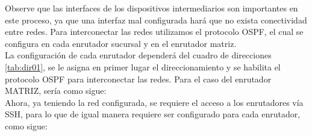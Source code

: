 \documentclass[conference]{IEEEtran}
\begin{document}
Observe que las interfaces de los dispositivos intermediarios son importantes en este proceso, ya que una interfaz mal configurada hará que no exista conectividad entre redes. Para interconectar las redes utilizamos el protocolo OSPF, el cual se configura en cada enrutador sucursal y en el enrutador matriz.\\
La configuración de cada enrutador dependerá del cuadro de direcciones \ref{tab:dir01}, se le asigna en primer lugar el direccionamiento y se habilita el protocolo OSPF para interconectar las redes. Para el caso del enrutador MATRIZ, sería como sigue:\\



Ahora, ya teniendo la red configurada, se requiere el acceso a los enrutadores vía SSH, para lo que de igual manera requiere ser configurado para cada enrutador, como sigue:


\end{document}
